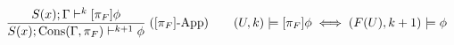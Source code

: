 \documentclass[preview]{standalone}
\begin{document}
\begin{align*}
\special{dvisvgm:raw <g id='unique000'>}\frac{S(x);\Gamma \vdash^k [\pi_F]\phi}{S(x);\operatorname{Cons}(\Gamma, \pi_F) \vdash^{k+1} \phi}\; ([\pi_F]\text{-App})\qquad (U, k) \models [\pi_F]\phi \;\Longleftrightarrow\; (F(U), k+1) \models \phi\special{dvisvgm:raw </g>}
\end{align*}
\end{document}
